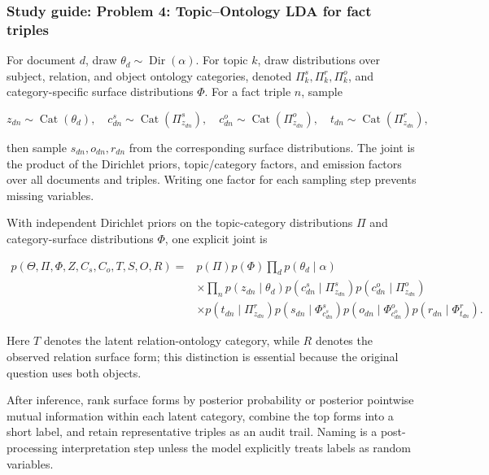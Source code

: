 \documentclass[11pt,a4paper]{article}
\begin{document}
\subsubsection{Study guide: Problem 4: Topic--Ontology LDA for fact triples}

For document $d$, draw $\theta_d\sim\operatorname{Dir}(\alpha)$. For topic $k$, draw distributions over subject, relation, and object ontology categories, denoted $\Pi_k^s,\Pi_k^r,\Pi_k^o$, and category-specific surface distributions $\Phi$. For a fact triple $n$, sample

\[
z_{dn}\sim\operatorname{Cat}(\theta_d),\quad
c^s_{dn}\sim\operatorname{Cat}(\Pi^s_{z_{dn}}),\quad
c^o_{dn}\sim\operatorname{Cat}(\Pi^o_{z_{dn}}),\quad
t_{dn}\sim\operatorname{Cat}(\Pi^r_{z_{dn}}),
\]

then sample $s_{dn},o_{dn},r_{dn}$ from the corresponding surface distributions. The joint is the product of the Dirichlet priors, topic/category factors, and emission factors over all documents and triples. Writing one factor for each sampling step prevents missing variables.

With independent Dirichlet priors on the topic-category distributions $\Pi$ and category-surface distributions $\Phi$, one explicit joint is

\[
\begin{aligned}
p(\Theta,\Pi,\Phi,Z,C_s,C_o,T,S,O,R)
={}&p(\Pi)p(\Phi)
\prod_d p(\theta_d\mid\alpha)\\
&\times\prod_n
p(z_{dn}\mid\theta_d)
p(c^s_{dn}\mid\Pi^s_{z_{dn}})
p(c^o_{dn}\mid\Pi^o_{z_{dn}})\\
&\times p(t_{dn}\mid\Pi^r_{z_{dn}})
p(s_{dn}\mid\Phi^s_{c^s_{dn}})
p(o_{dn}\mid\Phi^o_{c^o_{dn}})
p(r_{dn}\mid\Phi^r_{t_{dn}}).
\end{aligned}
\]

Here $T$ denotes the latent relation-ontology category, while $R$ denotes the observed relation surface form; this distinction is essential because the original question uses both objects.

After inference, rank surface forms by posterior probability or posterior pointwise mutual information within each latent category, combine the top forms into a short label, and retain representative triples as an audit trail. Naming is a post-processing interpretation step unless the model explicitly treats labels as random variables.
\end{document}
